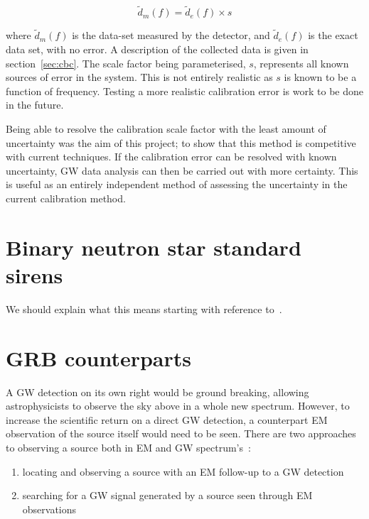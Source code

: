 \documentclass[12pt]{iopart}
\begin{document}
\begin{equation}
  \label{eq:scaledata}
  \tilde{d}_m(f) = \tilde{d}_e(f) \times s
\end{equation}

where $\tilde{d}_m(f)$ is the data-set measured by the detector, and
$\tilde{d}_e(f)$ is the exact data set, with no error. A description of the
collected data is given in section~\ref{sec:cbc}. The scale factor being
parameterised, $s$, represents all known sources of error in the system. This
is not entirely realistic as $s$ is known to be a function of frequency.
Testing a more realistic calibration error is work to be done in the future.


Being able to resolve the calibration scale factor with the least amount of
uncertainty was the aim of this project; to show that this method is
competitive with current techniques. If the calibration error can be resolved
with known uncertainty, GW data analysis can then be carried out with more
certainty. This is useful as an entirely independent method of assessing the
uncertainty in the current calibration method.

\section{Binary neutron star standard sirens\label{sec:sirens}}

We should explain what this means starting with reference
to~\cite{1986Natur.323..310S}.

\section{GRB counterparts\label{sec:GRB}}

A GW detection on its own right would be ground breaking, allowing
astrophysicists to observe the sky above in a whole new spectrum. However, to
increase the scientific return on a direct GW detection, a counterpart EM
observation of the source itself would need to be seen.  There are two
approaches to observing a source both in EM and GW spectrum's~\cite{grb}:

\begin{enumerate}
  \item locating and observing a source with an EM follow-up to
a GW detection
  \item searching for a GW signal generated by a source seen
through EM observations
\end{enumerate}
\end{document}
